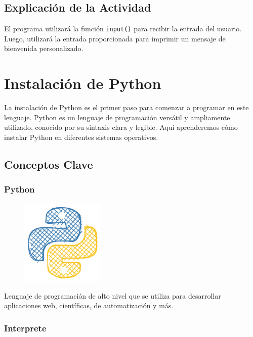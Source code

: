 \documentclass[
  a4paper,
  DIV=11,
  numbers=noendperiod,
  onepage,
  openany]{scrreprt}
\begin{document}
\section{Explicación de la
Actividad}\label{explicaciuxf3n-de-la-actividad}

El programa utilizará la función \texttt{input()} para recibir la
entrada del usuario. Luego, utilizará la entrada proporcionada para
imprimir un mensaje de bienvenida personalizado.

\chapter{Instalación de Python}\label{instalaciuxf3n-de-python}

La instalación de Python es el primer paso para comenzar a programar en
este lenguaje. Python es un lenguaje de programación versátil y
ampliamente utilizado, conocido por su sintaxis clara y legible. Aquí
aprenderemos cómo instalar Python en diferentes sistemas operativos.

\section{Conceptos Clave}\label{conceptos-clave-1}

\subsection{Python}\label{python}

\begin{figure}

{\centering \includegraphics[width=1.5625in,height=\textheight]{unidades/unidad1/images/python.png}

}

\end{figure}

Lenguaje de programación de alto nivel que se utiliza para desarrollar
aplicaciones web, científicas, de automatización y más.

\subsection{Interprete}\label{interprete}
\end{document}
